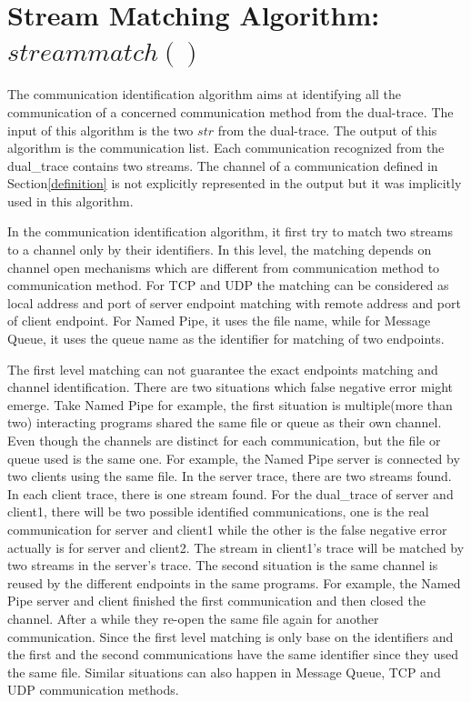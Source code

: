 \section{Stream Matching Algorithm: $streammatch()$}\label{streammatch}
The communication identification algorithm aims at identifying all the communication of a concerned communication method from the dual-trace. The input of this algorithm is the two $str$ from the dual-trace. The output of this algorithm is the communication list. Each communication recognized from the dual\_trace contains two streams. The channel of a communication defined in Section\ref{definition} is not explicitly represented in the output but it was implicitly used in this algorithm. 

In the communication identification algorithm, it first try to match two streams to a channel only by their identifiers. In this level, the matching depends on channel open mechanisms which are different from communication method to communication method. For TCP and UDP the matching can be considered as local address and port of server endpoint matching with remote address and port of client endpoint. For Named Pipe, it uses the file name, while for Message Queue, it uses the queue name as the identifier for matching of two endpoints. 

The first level matching can not guarantee the exact endpoints matching and channel identification. There are two situations which false negative error might emerge. Take Named Pipe for example, the first situation is multiple(more than two) interacting programs shared the same file or queue as their own channel. Even though the channels are distinct for each communication, but the file or queue used is the same one. For example, the Named Pipe server is connected by two clients using the same file. In the server trace, there are two streams found. In each client trace, there is one stream found. For the dual\_trace of server and client1, there will be two possible identified communications, one is the real communication for server and client1 while the other is the false negative error actually is for server and client2. The stream in client1's trace will be matched by two streams in the server's trace. The second situation is the same channel is reused by the different endpoints in the same programs. For example, the Named Pipe server and client finished the first communication and then closed the channel. After a while they re-open the same file again for another communication. Since the first level matching is only base on the identifiers and the first and the second communications have the same identifier since they used the same file. Similar situations can also happen in Message Queue, TCP and UDP communication methods. 

